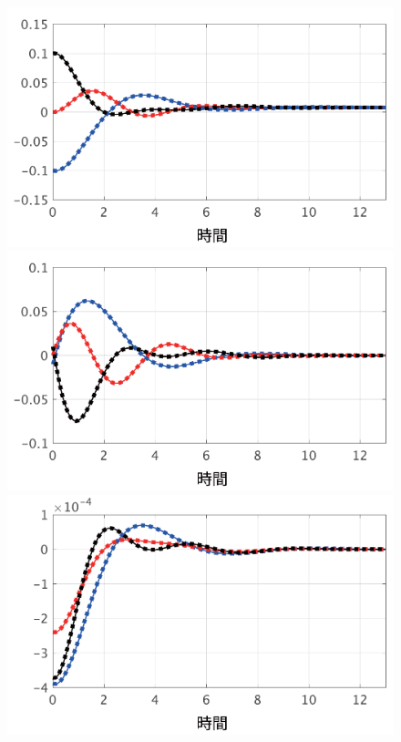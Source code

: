 \documentclass[a4j,10pt,oneside,openany,dvipdfmx]{jsbook}
\begin{document}
\begin{figure}[t]
  \centering
  {
  \begin{minipage}{0.32\linewidth}
    \centering
    \includegraphics[width = .99\linewidth]{figs/deltasp}
  \end{minipage}
  \begin{minipage}{0.32\linewidth}
    \centering
    \includegraphics[width = .99\linewidth]{figs/omegasp}
  \end{minipage}
  \begin{minipage}{0.32\linewidth}
    \centering
    \includegraphics[width = .99\linewidth]{figs/Esp}

\end{minipage}}
\end{figure}
\end{document}
